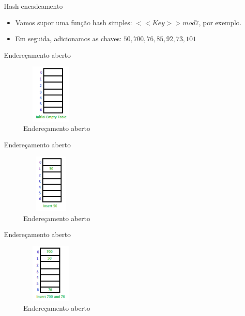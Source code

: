 \begin{frame}
	\begin{block}{Hash encadeamento}
		\begin{itemize}
			\item Vamos supor uma função hash simples: $<<Key>> mod 7$, por exemplo. 
			
			\item Em seguida, adicionamos as chaves: $ 50, 700, 76, 85, 92, 73, 101$

		\end{itemize}
	\end{block}
\end{frame}

\begin{frame}
	\begin{block}{Endereçamento aberto}
		\begin{figure}[!htb]
			\centering	  				
			\includegraphics[height=3cm, width = 3cm]{./pic/hashChaining11.png}
			\caption{Endereçamento aberto  \cite{GEEKS_2018}}
		\end{figure}
	\end{block}
\end{frame}

\begin{frame}
	\begin{block}{Endereçamento aberto}
		\begin{figure}[!htb]
			\centering	  				
			\includegraphics[height=3cm, width = 3cm]{./pic/hashChaining12.png}
			\caption{Endereçamento aberto  \cite{GEEKS_2018}}
		\end{figure}
	\end{block}
\end{frame}

\begin{frame}
	\begin{block}{Endereçamento aberto}
		\begin{figure}[!htb]
			\centering	  				
			\includegraphics[height=3cm, width = 3cm]{./pic/hashChaining13.png}
			\caption{Endereçamento aberto  \cite{GEEKS_2018}}
		\end{figure}
	\end{block}
\end{frame}

